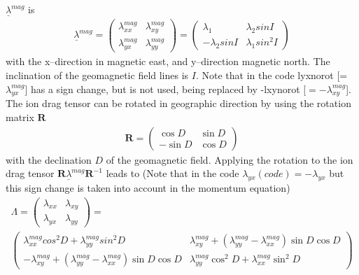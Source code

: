 $\underline{\lambda}^{mag}$ is
%
\begin{gather}
  \underline{\lambda}^{mag}=
   \begin{pmatrix}
      \lambda_{xx}^{mag} & \lambda_{xy}^{mag} \\
      \lambda_{yx}^{mag} & \lambda_{yy}^{mag}
   \end{pmatrix} =
   \begin{pmatrix}
      \lambda_1 & \lambda_{2}sin I\\
      -\lambda_2 sin I & \lambda_{1} sin^2 I
   \end{pmatrix}
\end{gather}
%
with the x--direction in magnetic east, and y--direction magnetic
north. The inclination of the geomagnetic
field lines is $I$. Note that in the code lyxnorot
[= $\lambda^{mag}_{yx}$] has a sign change, but is not used, being
replaced by -lxynorot [$= -\lambda^{mag}_{xy}$].  The
ion drag tensor can be rotated in geographic direction by using the
rotation matrix $\mathbf{R}$
%
\begin{gather}
   \mathbf{R} =
   \begin{pmatrix}
      \cos D & \sin D\\
     -\sin D & \cos D
   \end{pmatrix}
\end{gather}
%
with the declination $D$ of the geomagnetic field. Applying the
rotation to the ion drag tensor
$\mathbf{R}\underline{\lambda}^{mag}\mathbf{R}^{-1}$ leads to
 (Note that in the code $\lambda_{yx}(code) = -\lambda_{yx}$ but this
 sign change is taken into account in the momentum equation)
%
\begin{gather}
  \Lambda =
   \begin{pmatrix}
  \lambda_{xx} & \lambda_{xy}  \\
  \lambda_{yx} & \lambda_{yy}
   \end{pmatrix}
      = \\
   \begin{pmatrix}
  \lambda_{xx}^{mag} cos^2 D + \lambda_{yy}^{mag}
  sin^2 D &  \lambda_{xy}^{mag} + (\lambda_{yy}^{mag}-
  \lambda_{xx}^{mag}) \sin D \cos D  \\
  -\lambda_{xy}^{mag} + (\lambda_{yy}^{mag}-
  \lambda_{xx}^{mag}) \sin D \cos D  & \lambda_{yy}^{mag} \cos^2 D + \lambda_{xx}^{mag}
  \sin^2 D
   \end{pmatrix}
\end{gather}
%
